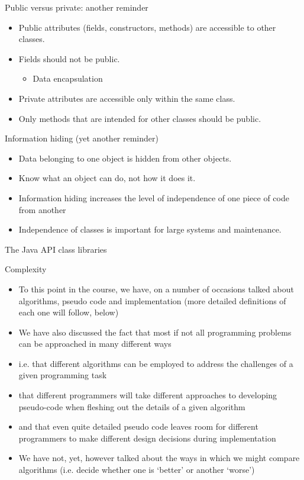 \documentclass{beamer}
\begin{document}
\begin{frame}

Public versus private: another reminder

\begin{itemize}
\item Public attributes (fields, constructors, methods) are accessible to other classes.
\item Fields should not be public.

\begin{itemize}
\item Data encapsulation
\end{itemize}
\item Private attributes are accessible only within the same class.
\item Only methods that are intended for other classes should be public.
\end{itemize}

\end{frame} \begin{frame}

Information hiding (yet another reminder)

\begin{itemize}
\item Data belonging to one object is hidden from other objects. 
\item Know what an object can do, not how it does it. 
\item Information hiding increases the level of independence of one piece of code from another
\item Independence of classes is important for large systems and maintenance.
\end{itemize}
\end{frame} 

The Java API class libraries
\begin{frame}
Complexity
\begin{itemize}
\item To this point in the course, we have, on a number of occasions talked about algorithms, pseudo code and
implementation (more detailed definitions of each one will follow, below)
\item We have also discussed the fact that most if not all programming problems can be approached in many different ways
\item i.e. that different algorithms can be employed to address the challenges of a given programming task
\item that different programmers will take different approaches to developing pseudo-code when fleshing out the details
of a given algorithm
\item and that even quite detailed pseudo code leaves room for different programmers to make different design decisions
during implementation
\item We have not, yet, however talked about the ways in which we might compare algorithms (i.e. decide whether one is
`better' or another `worse')
\end{itemize}

\end{frame} 
\end{document}

